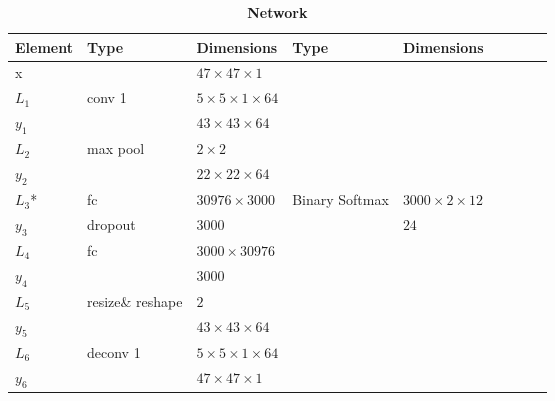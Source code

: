 \begin{table}[h!]
  \caption*{\textbf{Network \networkII}}
	\centering
	{\footnotesize
		\begin{tabular}{|lllllllll|}
			\hline
			\multicolumn{1}{|l|}{Element} & Type             & \multicolumn{1}{l|}{Dimensions}                  & Type   & \multicolumn{1}{l|}{Dimensions}             \\ \hline
			\multicolumn{1}{|l|}{x}       &                  & \multicolumn{1}{l|}{$47\times47\times1$}         &         & \multicolumn{1}{l|}{}                      \\ \hline
			\multicolumn{1}{|l|}{$L_1$}   & conv 1           & \multicolumn{1}{l|}{$5\times 5\times1\times 64$} &         & \multicolumn{1}{l|}{}                      \\
			\multicolumn{1}{|l|}{$y_1$}   &                  & \multicolumn{1}{l|}{$43\times43\times64$}        &         & \multicolumn{1}{l|}{}                      \\ \hline
			\multicolumn{1}{|l|}{$L_2$}   & max pool         & \multicolumn{1}{l|}{$2\times 2$}                 &         & \multicolumn{1}{l|}{}                      \\
			\multicolumn{1}{|l|}{$y_2$}   &                  & \multicolumn{1}{l|}{$22\times22\times 64$}       &         & \multicolumn{1}{l|}{}                      \\ \hline
			\multicolumn{1}{|l|}{$L_3$*}  & fc               & \multicolumn{1}{l|}{$30976\times3000$}           & Binary
                                                                                                            Softmax & \multicolumn{1}{l|}{$3000\times2\times12$} \\
			\multicolumn{1}{|l|}{$y_3$}   & dropout          & \multicolumn{1}{l|}{$3000$}                      &         & \multicolumn{1}{l|}{$24$}                  \\ \hline
			\multicolumn{1}{|l|}{$L_4$}   & fc               & \multicolumn{1}{l|}{$3000\times30976$}           &         & \multicolumn{1}{l|}{}                      \\
			\multicolumn{1}{|l|}{$y_4$}   &                  & \multicolumn{1}{l|}{$3000$}                      &         & \multicolumn{1}{l|}{}                      \\ \hline
			\multicolumn{1}{|l|}{$L_5$}   & resize\& reshape & \multicolumn{1}{l|}{$2$}                         &         & \multicolumn{1}{l|}{}                      \\
			\multicolumn{1}{|l|}{$y_5$}   &                  & \multicolumn{1}{l|}{$43\times43\times 64$}       &         & \multicolumn{1}{l|}{}                      \\ \hline
			\multicolumn{1}{|l|}{$L_6$}   & deconv 1         & \multicolumn{1}{l|}{$5\times 5\times1\times 64$} &         & \multicolumn{1}{l|}{}                      \\
			\multicolumn{1}{|l|}{$y_6$}   &                  & \multicolumn{1}{l|}{$47\times47\times1$}         &         & \multicolumn{1}{l|}{}                      \\ \hline
		\end{tabular}

}
\end{table}
